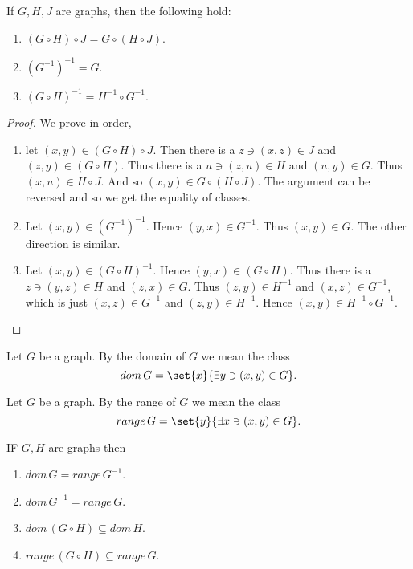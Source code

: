\begin{Theorem}
    If $G,H,J$ are graphs, then the following hold:
    \begin{enumerate}
	\item $(G \circ H)\circ J = G \circ (H \circ J)$.
	\item ${(G^{-1})}^{-1} = G $.
	\item ${(G \circ H)}^{-1} = H^{-1} \circ G^{-1}$.
    \end{enumerate}
\end{Theorem}
\begin{proof}
    We prove in order,
    \begin{enumerate}
	\item let $(x,y) \in (G \circ H)\circ J$. Then there is a $ z \ni (x,z) \in J$ and 
	    $(z,y) \in (G \circ H) $. Thus there is a $u \ni (z,u) \in H$ and $(u,y) \in G$. Thus $(x,u) \in 
	    H \circ J$. And so $(x,y) \in G \circ (H \circ J)$. The argument can be reversed and 
	    so we get the equality of classes. 
	\item Let $(x,y) \in {(G^{-1})}^{-1}$. Hence $(y,x) \in G^{-1}$. Thus $(x,y) \in G$. The
	    other direction is similar.
	\item Let $(x,y) \in {(G \circ H)}^{-1}$. Hence $(y,x) \in (G \circ H)$. Thus there is a 
	    $z \ni (y,z) \in H$ and $(z,x) \in G$. Thus $(z,y) \in H^{-1}$ and $(x,z) \in G^{-1}$, 
	    which is just $(x,z) \in G^{-1}$ and $(z,y) \in H^{-1}$. Hence 
	    $(x,y) \in H^{-1} \circ G^{-1}$.
    \end{enumerate}
\end{proof}

\begin{Definition}
    Let $G$ be a graph. By the domain of $G$ we mean the class
    \begin{equation*}
	dom\,G = \set{x}{\exists y \ni (x,y) \in G}.
    \end{equation*}
\end{Definition}

\begin{Definition}
    Let $G$ be a graph. By the range of $G$ we mean the class
    \begin{equation*}
	range\,G = \set{y}{\exists x \ni (x,y) \in G}.
    \end{equation*}
\end{Definition}

\begin{Theorem}
    IF $G,H$ are graphs then
    \begin{enumerate}
	\item $dom\,G = range\,G^{-1}$.
	\item $dom\,G^{-1} = range\,G$.
	\item $dom\,(G \circ H) \subseteq dom\,H$.
	\item $range\,(G \circ H) \subseteq range\,G$.
    \end{enumerate}
\end{Theorem}

